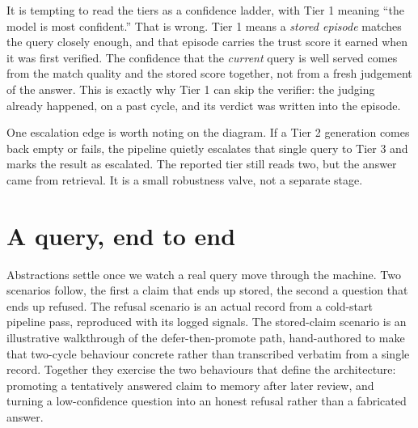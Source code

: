 \begin{pitfall}
It is tempting to read the tiers as a confidence ladder, with Tier 1 meaning
``the model is most confident.'' That is wrong. Tier 1 means a \emph{stored
episode} matches the query closely enough, and that episode carries the trust
score it earned when it was first verified. The confidence that the \emph{current}
query is well served comes from the match quality and the stored score together,
not from a fresh judgement of the answer. This is exactly why Tier 1 can skip the
verifier: the judging already happened, on a past cycle, and its verdict was
written into the episode.
\end{pitfall}

One escalation edge is worth noting on the diagram. If a Tier 2 generation comes
back empty or fails, the pipeline quietly escalates that single query to Tier 3
and marks the result as escalated. The reported tier still reads two, but the
answer came from retrieval. It is a small robustness valve, not a separate stage.

\section{A query, end to end}
\label{sec:end-to-end}

Abstractions settle once we watch a real query move through the machine. Two
scenarios follow, the first a claim that ends up stored, the second a question
that ends up refused. The refusal scenario is an actual record from a cold-start
pipeline pass, reproduced with its logged signals. The stored-claim scenario is an
illustrative walkthrough of the defer-then-promote path, hand-authored to make that
two-cycle behaviour concrete rather than transcribed verbatim from a single record.
Together they exercise the two behaviours that define the architecture: promoting
a tentatively answered claim to memory after later review, and turning a
low-confidence question into an honest refusal rather than a fabricated answer.


